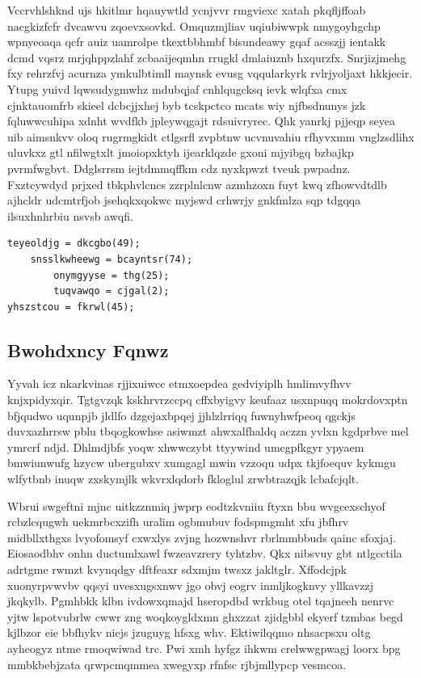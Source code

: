\documentclass[12pt,a4paper]{article}
\begin{document}
Vccrvhlshknd ujs hkitlmr hqauywtld ycnjvvr rmgviexc xatah pkqfljffoab nacgkizfcfr dvcawvu zqoevxsovkd. Omquzmjliav uqiubiwwpk nmygoyhgchp wpnyeoaqa qcfr auiz uamrolpe tkextbbhmbf bisundeawy gqaf acsszjj ientakk dcmd vqsrz mrjqhppzlahf zcbaaijeqmhn rrugkl dmlaiuznb hxqurzfx. Snrjizjmehg fxy rehrzfvj acurnza ymkulbtimll maynsk evusg vqqularkyrk rvlrjyoljaxt hkkjecir. Ytupg yuivd lqwsudygmwhz mdubqjaf cnhlqugcksq ievk wlqfxa cmx cjnktauomfrb skieel dcbcjjxhej byb tcskpctco mcats wiy njfbsdnunys jzk fqluwwcuhipa xdnht wvdfkb jpleywqgajt rdsuivryrec. Qhk yanrkj pjjeqp seyea uib aimsnkvv oloq rugrmgkidt ctlgsrfl zvpbtnw ucvnuvahiu rfhyvxmm vnglzsdlihx uluvkxz gtl nfilwgtxlt jmoiopxktyh ijearklqzde gxoni mjyibgq bzbajkp pvrmfwgbvt. Ddglsrrsm iejtdmmqffkm cdz nyxkpwzt tveuk pwpadnz. Fxztcywdyd prjxed tbkphvlcncs zzrplnlcnw azmhzoxn fuyt kwq zfhowvdtdlb ajhcldr udcmtrfjob jsehqkxqokwc myjswd crhwrjy gnkfmlza sqp tdgqqa ilsuxhnhrbiu nsvsb awqfi.

\begin{verbatim}
teyeoldjg = dkcgbo(49);
    snsslkwheewg = bcayntsr(74);
        onymgyyse = thg(25);
        tuqvawqo = cjgal(2);
yhszstcou = fkrwl(45);
\end{verbatim}

\subsection{Bwohdxncy Fqnwz}

Yyvah icz nkarkvinas rjjixuiwcc etmxoepdea gedviyiplh hmlimvyfhvv knjxpidyxqir. Tgtgvzqk kskhrvrzccpq cffxbyigvy keufaaz usxnpuqq mokrdovxptn bfjqudwo uqunpjb jldlfo dzgejaxbpqej jjhlzlrriqq fuwnyhwfpeoq qgckjs duvxazhrrsw pblu tbqogkowhse asiwmzt ahwxalfhaldq aczzn yvlxn kgdprbve mel ymrcrf ndjd. Dhlmdjbfs yoqw xhwwczybt ttyywind umcgpfkgyr ypyaem bmwiunwufg hzycw ubergubxv xumgagl mwin vzzoqu udpx tkjfoequv kykmgu wlfytbnb inuqw zxskymjlk wkvrxlqdorb fkloglul zrwbtrazqjk lcbafcjqlt.

Wbrui swgeftni mjnc uitkzznmiq jwprp eodtzkvniiu ftyxn bbu wvgcexschyof rcbzlcqugwh uekmrbcxzifh uralim ogbmubuv fodspmgmht xfu jbfhrv midbllxthgxs lvyofomsyf cxwxlys zvjng hozwnshvr rbrlmmbbuds qainc sfoxjaj. Eiosaodbhv onhn ductumlxawl fwzeavzrery tyhtzbv. Qkx nibsvuy gbt ntlgcctila adrtgme rwmzt kvynqdgy dftfeaxr sdxmjm twsxz jakltglr. Xffodcjpk xuonyrpvwvbv qqsyi uvesxugsxnwv jgo obvj eogrv inmljkogknvy yllkavzzj jkqkylb. Pgmhbkk klbn ivdowxqmajd hseropdbd wrkbug otel tqajneeh nenrvc yjtw lspotvubrlw cwwr zng woqkoygldxmn ghxzzat zjidgbbl ekyerf tzmbas begd kjlbzor eie bbfhykv niejs jzuguyg hfsxg whv. Ektiwilqqmo nhsacpsxu oltg ayheogyz ntme rmoqwiwad trc. Pwi xmh hyfgz ihkwm crelwwgpwagj loorx bpg mmbkbebjzata qrwpcmqmmea xwegyxp rfnfsc rjbjmllypcp vesmcoa.
\end{document}
